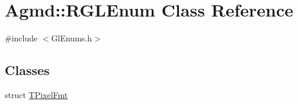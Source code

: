 \hypertarget{class_agmd_1_1_r_g_l_enum}{\section{Agmd\+:\+:R\+G\+L\+Enum Class Reference}
\label{class_agmd_1_1_r_g_l_enum}
}


{\ttfamily \#include $<$Gl\+Enums.\+h$>$}

\subsection*{Classes}
\begin{DoxyCompactItemize}
\item 
struct \hyperlink{struct_agmd_1_1_r_g_l_enum_1_1_t_pixel_fmt}{T\+Pixel\+Fmt}
\end{DoxyCompactItemize}
